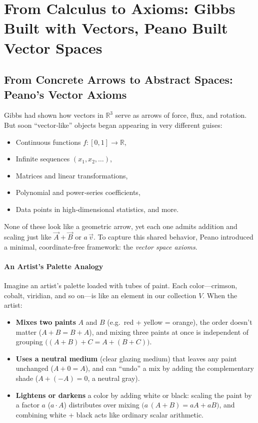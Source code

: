 \section{From Calculus to Axioms: Gibbs Built with Vectors, Peano Built Vector Spaces}

\subsection{From Concrete Arrows to Abstract Spaces: Peano’s Vector Axioms}

Gibbs had shown how vectors in \(\mathbb R^3\) serve as arrows of force, flux, and rotation.  But soon “vector‐like” objects began appearing in very different guises:

\begin{itemize}
  \item Continuous functions \(f:[0,1]\to\mathbb R\),
  \item Infinite sequences \((x_1,x_2,\dots)\),
  \item Matrices and linear transformations,
  \item Polynomial and power‐series coefficients,
  \item Data points in high‐dimensional statistics, and more.
\end{itemize}

None of these look like a geometric arrow, yet each one admits addition and scaling just like \(\vec A+\vec B\) or \(a\,\vec v\).  To capture this shared behavior, Peano introduced a minimal, coordinate‐free framework: the \emph{vector space axioms}.

\paragraph{An Artist’s Palette Analogy}  
Imagine an artist’s palette loaded with tubes of paint.  Each color—crimson, cobalt, viridian, and so on—is like an element in our collection \(V\).  When the artist:

\begin{itemize}
  \item \textbf{Mixes two paints} \(A\) and \(B\) (e.g.\ red + yellow = orange), the order doesn’t matter (\(A+B=B+A\)), and mixing three paints at once is independent of grouping \(\bigl((A+B)+C = A+(B+C)\bigr)\).
  \item \textbf{Uses a neutral medium} (clear glazing medium) that leaves any paint unchanged (\(A+0=A\)), and can “undo” a mix by adding the complementary shade (\(A+(-A)=0\), a neutral gray).
  \item \textbf{Lightens or darkens} a color by adding white or black: scaling the paint by a factor \(a\) (\(a\cdot A\)) distributes over mixing \(\bigl(a\,(A+B)=aA+aB\bigr)\), and combining white + black acts like ordinary scalar arithmetic.
\end{itemize}

